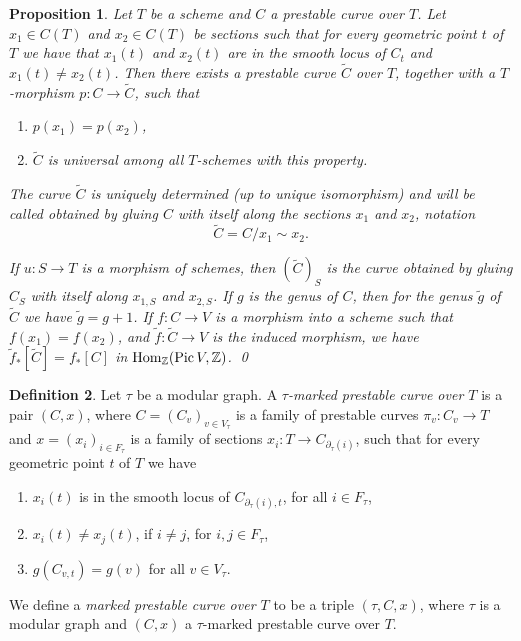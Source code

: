 \documentclass[11pt]{amsart}
\newtheorem{prop}{Proposition}[section]
\theoremstyle{definition}
\newtheorem{defn}[prop]{Definition}
\theoremstyle{remark}
\renewcommand{\tilde}{\widetilde}
\newcommand{\lst}{_{\ast}}
\newcommand{\zz}{{\mathbb{Z}}}
\newcommand{\del}{\partial}
\newcommand{\Hom}{\operatorname{\rm Hom}\nolimits}
\newcommand{\Pic}{\operatorname{\rm Pic}\nolimits}
\renewcommand{\t}{_{\tau}}
\theoremstyle{plain}
\theoremstyle{definition}
\theoremstyle{remark}
\begin{document}
\begin{prop} \label{glue1}
Let \(T\) be a scheme and \(C\) a prestable curve over \(T\). Let \(x_1\in C(T)\) and
\(x_2\in C(T)\) be sections
such that for every geometric point \(t\) of \(T\) we have that \(x_1(t)\) and
\(x_2(t)\) are in the smooth locus of \(C_{t}\) and
\(x_1(t)\not= x_2(t)\). Then there exists a prestable curve \(\tilde{C}\) over \(T\),
together with a \(T\)-morphism
\(p:C\rightarrow \tilde{C}\), such that
\begin{enumerate}
\item \(p(x_1)=p(x_2)\),
\item \(\tilde{C}\) is universal among { all }\(T\)-schemes with this property.
\end{enumerate}
The curve \(\tilde{C}\) is uniquely determined (up to unique isomorphism) and
will be called {\em obtained by gluing \(C\)
with itself along the sections \(x_1\) and \(x_2\)}, notation
\[
\tilde{C}=C/{x_1\sim x_2}.
\]

If \(u:S\rightarrow T\) is a morphism of schemes, then \((\tilde{C})_S\) is the
curve obtained by gluing \(C_{S}\) with itself along
\(x_{1,S}\) and \(x_{2,S}\). If \(g\) is the genus of \(C\), then for the genus
\(\tilde{g}\) of \(\tilde{C}\) we have \(\tilde{g}=g+1\).
If \(f:C\rightarrow V\) is a morphism into a scheme such that \(f(x_1)=f(x_2)\),
and \(\tilde{f}:\tilde{C}\rightarrow
V\) is the induced morphism, we have \(\tilde{f}\lst[\tilde{C}]={f}\lst[C]\) in
\(\Hom_\zz(\Pic V,\zz)\). \qed
\end{prop}

\begin{defn} \label{mpc}
Let \(\tau\) be a modular graph. A {\em \(\tau\)-marked prestable curve over \(T\)}
is a pair \((C,x)\), where \(C=(C_v)_{v\in
V\t}\) is a family of prestable curves \(\pi_v:C_v\rightarrow T\) and
\(x=(x_i)_{i\in F\t}\) is a family of sections
\(x_i:T\rightarrow C_{\del\t(i)}\), such that for every geometric point \(t\) of
\(T\) we have
\begin{enumerate}
\item \(x_i(t)\) is in the smooth locus of \(C_{\del\t(i),t}\), for all \(i\in F\t\),
\item \(x_i(t)\not=x_j(t)\), if \(i\not=j\), for \(i,j\in F\t\),
\item \(g(C_{v,t})=g(v)\) for all \(v\in V\t\).
\end{enumerate}

We define a {\em marked prestable curve over \(T\)} to be a triple \((\tau,C,x)\),
where \(\tau\) is a modular graph and
\((C,x)\) a \(\tau\)-marked prestable curve over \(T\).
\end{defn}
\end{document}
